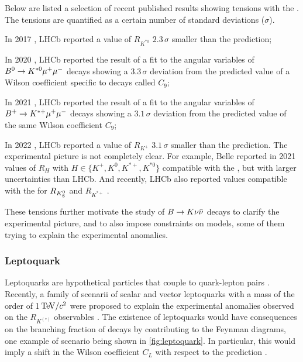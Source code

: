 Below are listed a selection of recent published results showing tensions with the \SM.
The tensions are quantified as a certain number of standard deviations ($\sigma$).
\bi
\item In 2017 \cite{LHCb:2017avl}, LHCb reported a value of $R_{K^{*0}}$ $2.3\,\sigma$ smaller than the \SM prediction;
\item In 2020 \cite{LHCb:2020lmf}, LHCb reported the result of a fit to the angular variables of $B^0\rightarrow K^{*0}\mu^+\mu^-$ decays showing a $3.3\,\sigma$ deviation from the predicted \SM value of a Wilson coefficient specific to \BKll decays called $C_9$;
\item In 2021 \cite{LHCb:2020gog}, LHCb reported the result of a fit to the angular variables of $B^+\rightarrow K^{*+}\mu^+\mu^-$ decays showing a $3.1\,\sigma$ deviation from the predicted \SM value of the same Wilson coefficient $C_9$;
\item In 2022 \cite{LHCb:2021trn}, LHCb reported a value of $R_{K^+}$ $3.1\,\sigma$ smaller than the \SM prediction.
\ei
The experimental picture is not completely clear.
For example, Belle reported in 2021 \cite{Belle:2019oag, BELLE:2019xld} values of $R_{H}$ with $H\in\{K^+,K^0,K^{*+},K^{*0}\}$ compatible with the \SM, but with larger uncertainties than LHCb.
And recently, LHCb also reported values compatible with the \SM for $R_{K^0_{\mathrm{S}}}$ and $R_{K^{*+}}$ \cite{LHCb:2021lvy}. 

These tensions further motivate the study of $B\rightarrow K\nu\bar{\nu}$ decays to clarify the experimental picture, and to also impose constraints on \NP models, some of them trying to explain the experimental anomalies.
\subsubsection*{Leptoquark}
Leptoquarks are hypothetical particles that couple to quark-lepton pairs \cite{Buchmuller:1986zs}.
Recently, a family of scenarii of scalar and vector leptoquarks with a mass of the order of 1$\mathrm{\,Te\kern -0.1em V}/c^2$ were proposed to explain the experimental anomalies observed on the $R_{K^{(*)}}$ observables \cite{Becirevic:2018afm,Angelescu:2021lln}.
The existence of leptoquarks would have consequences on the branching fraction of \BKnn decays by contributing to the Feynman diagrams, one example of scenario being shown in \cref{fig:leptoquark}.
In particular, this would imply a shift in the Wilson coefficient $C_L$ with respect to the \SM prediction \cite{Becirevic:2018afm}.

